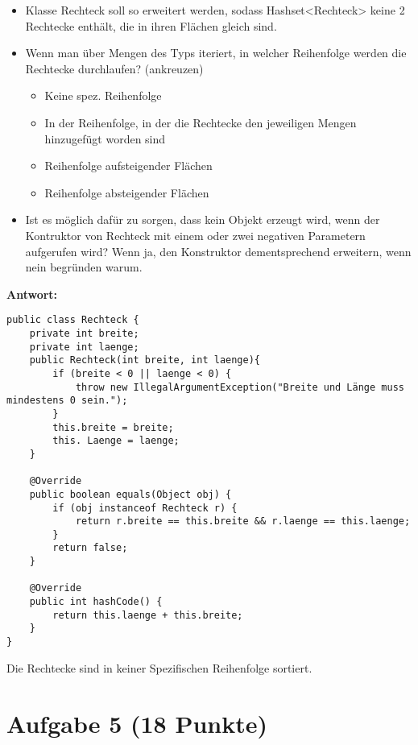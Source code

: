 \begin{itemize}
    \item Klasse Rechteck soll so erweitert werden, sodass Hashset<Rechteck> keine 2
          Rechtecke enthält, die in ihren Flächen gleich sind.
    \item Wenn man über Mengen des Typs iteriert, in welcher Reihenfolge werden die
          Rechtecke durchlaufen? (ankreuzen)
          \begin{itemize}
              \item Keine spez. Reihenfolge
              \item In der Reihenfolge, in der die Rechtecke den jeweiligen Mengen hinzugefügt
                    worden sind
              \item Reihenfolge aufsteigender Flächen
              \item Reihenfolge absteigender Flächen
          \end{itemize}
    \item Ist es möglich dafür zu sorgen, dass kein Objekt erzeugt wird, wenn der
          Kontruktor von Rechteck mit einem oder zwei negativen Parametern aufgerufen
          wird? Wenn ja, den Konstruktor dementsprechend erweitern, wenn nein begründen
          warum.
\end{itemize}

\textbf{Antwort:}

\begin{lstlisting}
public class Rechteck {
    private int breite;
    private int laenge;
    public Rechteck(int breite, int laenge){
        if (breite < 0 || laenge < 0) {
            throw new IllegalArgumentException("Breite und Länge muss mindestens 0 sein.");
        }
        this.breite = breite;
        this. Laenge = laenge;
    }

    @Override
    public boolean equals(Object obj) {
        if (obj instanceof Rechteck r) {
            return r.breite == this.breite && r.laenge == this.laenge;
        }
        return false;
    }

    @Override
    public int hashCode() {
        return this.laenge + this.breite;
    }
}
\end{lstlisting}

Die Rechtecke sind in keiner Spezifischen Reihenfolge sortiert.

\section{Aufgabe 5 (18 Punkte)}

